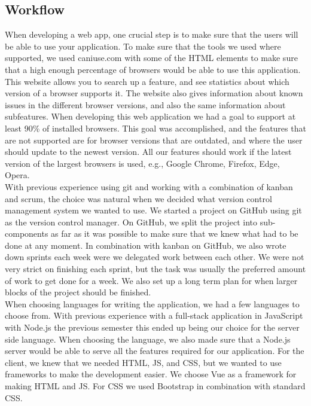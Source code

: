 \subsection{Workflow}
When developing a web app, one crucial step is to make sure that the users will be able to use your application. To make sure that the tools we used where supported, we used caniuse.com\cite{canIUse:Info} with some of the HTML elements to make sure that a high enough percentage of browsers would be able to use this application. This website allows you to search up a feature, and see statistics about which version of a browser supports it. The website also gives information about known issues in the different browser versions, and also the same information about subfeatures. When developing this web application we had a goal to support at least 90\% of installed browsers. This goal was accomplished, and the features that are not supported are for browser versions that are outdated, and where the user should update to the newest version. All our features should work if the latest version of the largest browsers is used, e.g., Google Chrome, Firefox, Edge, Opera.
\\[11pt]
With previous experience using git and working with a combination of kanban and scrum, the choice was natural when we decided what version control management system we wanted to use. We started a project on GitHub using git as the version control manager. On GitHub, we split the project into sub-components as far as it was possible to make sure that we knew what had to be done at any moment. In combination with kanban on GitHub, we also wrote down sprints each week were we delegated work between each other. We were not very strict on finishing each sprint, but the task was usually the preferred amount of work to get done for a week. We also set up a long term plan for when larger blocks of the project should be finished.
\\[11pt]
When choosing languages for writing the application, we had a few languages to choose from. With previous experience with a full-stack application in JavaScript with Node.js the previous semester this ended up being our choice for the server side language. When choosing the language, we also made sure that a Node.js server would be able to serve all the features required for our application. For the client, we knew that we needed HTML, JS, and CSS, but we wanted to use frameworks to make the development easier. We choose Vue as a framework for making HTML and JS. For CSS we used Bootstrap in combination with standard CSS.